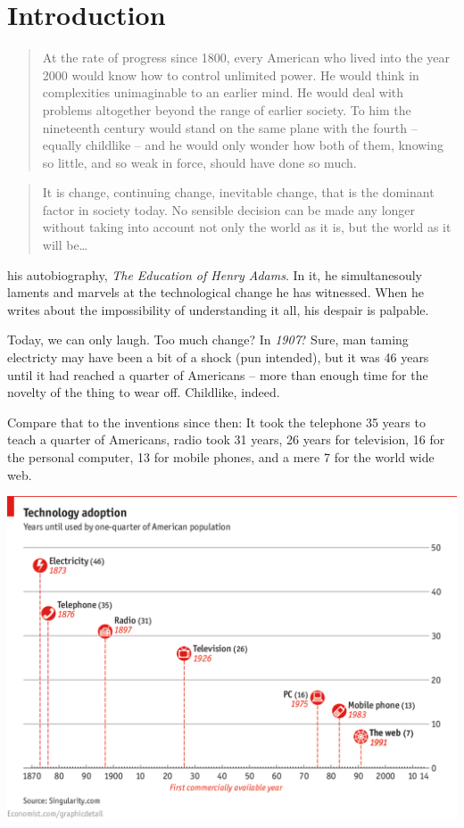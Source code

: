 \chapter{Introduction}
\begin{quote}
At the rate of progress since 1800, every American who lived into the year 2000
would know how to control unlimited power. He would think in complexities
unimaginable to an earlier mind. He would deal with problems altogether beyond
the range of earlier society. To him the nineteenth century would stand on the
same plane with the fourth -- equally childlike -- and he would only wonder how
both of them, knowing so little, and so weak in force, should have done so much.
\end{quote}

\begin{quote}
It is change, continuing change, inevitable change, that is the dominant factor
in society today. No sensible decision can be made any longer without taking
into account not only the world as it is, but the world as it will be\ldots
{}
\end{quote} 

 his autobiography, \textit{The Education of Henry
Adams}. In it, he simultanesouly laments and marvels at the technological change
he has witnessed. When he writes about the impossibility of
understanding it all, his despair is palpable. 

Today, we can only laugh. Too much change? In \textit{1907}? Sure, man taming electricty may have
been a bit of a shock (pun intended), but it was 46 years until it had reached a
quarter of Americans -- more than enough time for the novelty of the thing to
wear off. Childlike, indeed.

Compare that to the inventions since then: It took the telephone 35 years to teach a quarter of Americans, radio
took 31 years, 26 years for television, 16 for the personal computer, 13 for
mobile phones, and a mere 7 for the world wide web.\bigskip

\includegraphics[width=\textwidth]{graphics/accelerating-change}
\bigskip

